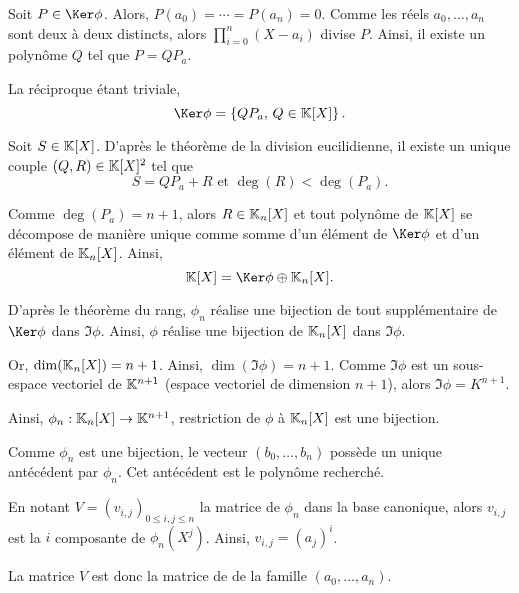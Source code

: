 \begin{elemsolution}
\begin{reponses}
\item
\begin{reponses}
\item Soit $P \in \Ker \phi$. Alors, $P(a_0) = \cdots = P(a_n) = 0$. Comme les réels $a_0,\ldots,a_n$ sont deux à deux distincts, alors $\prod\limits_{i=0}^n (X - a_i)$ divise $P$. Ainsi, il existe un polynôme $Q$ tel que $P = Q P_a$.

La réciproque étant triviale,
\[
\Ker \phi = \left\{Q P_a,\, Q \in \K[X]\right\}.
\]

\item Soit $S \in \mathbb{K}[X]$. D'après le théorème de la division eucilidienne, il existe un unique couple $(Q, R) \in \mathbb{K}[X]^2$ tel que
\[
S = Q P_a + R
\text{ et }
\deg(R) < \deg(P_a).
\]

Comme $\deg(P_a) = n + 1$, alors $R \in \mathbb{K}_n[X]$ et tout polynôme de $\mathbb{K}[X]$ se décompose de manière unique comme somme d'un élément de $\Ker \phi$ et d'un élément de $\mathbb{K}_n[X]$. Ainsi,
\[
\K[X] = \Ker \phi \oplus \K_n[X].
\]

\item D'après le théorème du rang, $\phi_n$ réalise une bijection de tout supplémentaire de $\Ker \phi$ dans $\Im \phi$. Ainsi, $\phi$ réalise une bijection de $\mathbb{K}_n[X]$ dans $\Im \phi$.

Or, $\dim(\mathbb{K}_n[X]) = n + 1$. Ainsi, $\dim(\Im \phi) = n + 1$. Comme $\Im \phi$ est un sous-espace vectoriel de $\mathbb{K}^{n+1}$ (espace vectoriel de dimension $n + 1$), alors $\Im \phi = K^{n+1}$.

Ainsi, $\phi_n : \mathbb{K}_n[X] \to \mathbb{K}^{n+1}$, restriction de $\phi$ à $\mathbb{K}_n[X]$ est une bijection.

\item Comme $\phi_n$ est une bijection, le vecteur $(b_0,\ldots,b_n)$ possède un unique antécédent par $\phi_n$. Cet antécédent est le polynôme recherché.
\end{reponses}

\item
\begin{reponses}
\item En notant $V = (v_{i,j})_{0 \leq i, j \leq n}$ la matrice de $\phi_n$ dans la base canonique, alors $v_{i,j}$ est la $i$\ieme{} composante de $\phi_n(X^j)$. Ainsi, $v_{i,j} = (a_j)^i$.

La matrice $V$ est donc la matrice de  de la famille $(a_0,\ldots,a_n)$.


\end{reponses}
\end{reponses}
\end{elemsolution}
